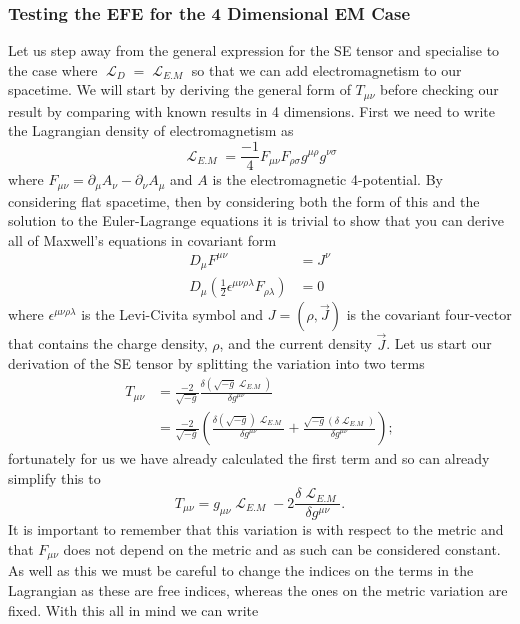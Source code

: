 \documentclass[12pt]{article}
\numberwithin{equation}{section}
\DeclareMathOperator{\Lagr}{\mathcal{L}}
\numberwithin{figure}{section}
\begin{document}
\subsubsection{Testing the EFE for the 4 Dimensional EM Case} %
\label{sub:from_the_vacumm_to_electromagnetism}
Let us step away from the general expression for the SE tensor and specialise to the case where $\Lagr_D = \Lagr_{E.M}$ so that we can add electromagnetism to our spacetime. We will start by deriving the general form of $T_{\mu\nu}$ before checking our result by comparing with known results in 4 dimensions. First we need to write the Lagrangian density of electromagnetism as
\begin{equation}
	\Lagr_{E.M} = \frac{-1}{4} F_{\mu\nu} F_{\rho\sigma} g^{\mu\rho} g^{\nu\sigma}
\end{equation}
where $F_{\mu\nu} = \partial_\mu A_\nu - \partial_\nu A_\mu$ and $A$ is the electromagnetic 4-potential. By considering flat spacetime, then by considering both the form of this and the solution to the Euler-Lagrange equations it is trivial to show that you can derive all of Maxwell's equations in covariant form
\begin{align}
	D_{\mu}F^{\mu\nu}&=J^{\nu}\\
	D_{\mu}\left(\frac{1}{2}\epsilon^{\mu\nu\rho\lambda}F_{\rho\lambda}\right)&=0
\end{align}
where $\epsilon^{\mu\nu\rho\lambda}$ is the Levi-Civita symbol and $J=\left(\rho,\vec{J}\right)$ is the covariant four-vector that contains the charge density, $\rho$, and the current density $\vec{J}$.
Let us start our derivation of the SE tensor by splitting the variation into two terms
\begin{align}
	T_{\mu\nu}&=\frac{-2}{\sqrt{-g}}\frac{\delta(\sqrt{-g}\Lagr_{E.M})}{\delta g^{\mu\nu}}\\
	&= \frac{-2}{\sqrt{-g}}\left(\frac{\delta(\sqrt{-g})\Lagr_{E.M}}{\delta g^{\mu\nu}} + \frac{\sqrt{-g}(\delta \Lagr_{E.M})}{\delta g^{\mu\nu}} \right);
	\label{eq:SE_EM_unf}
\end{align}
fortunately for us we have already calculated the first term and so can already simplify this to
\begin{equation}
	T_{\mu\nu}= g_{\mu\nu}\Lagr_{E.M} - 2 \frac{\delta \Lagr_{E.M}}{\delta g^{\mu\nu}}. \label{eq:energy_mom_tensor_w_lagr}
\end{equation}
It is important to remember that this variation is with respect to the metric and that $F_{\mu\nu}$ does not depend on the metric and as such can be considered constant. As well as this we must be careful to change the indices on the terms in the Lagrangian as these are free indices, whereas the ones on the metric variation are fixed. With this all in mind we can write
\end{document}
